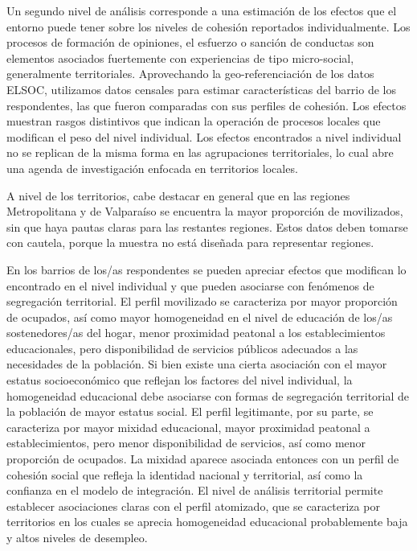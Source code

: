 \documentclass[
  12pt,
]{book}
\begin{document}
Un segundo nivel de análisis corresponde a una estimación de los efectos que el entorno puede tener sobre los niveles de cohesión reportados individualmente. Los procesos de formación de opiniones, el esfuerzo o sanción de conductas son elementos asociados fuertemente con experiencias de tipo micro-social, generalmente territoriales. Aprovechando la geo-referenciación de los datos ELSOC, utilizamos datos censales para estimar características del barrio de los respondentes, las que fueron comparadas con sus perfiles de cohesión. Los efectos muestran rasgos distintivos que indican la operación de procesos locales que modifican el peso del nivel individual. Los efectos encontrados a nivel individual no se replican de la misma forma en las agrupaciones territoriales, lo cual abre una agenda de investigación enfocada en territorios locales.

A nivel de los territorios, cabe destacar en general que en las regiones Metropolitana y de Valparaíso se encuentra la mayor proporción de movilizados, sin que haya pautas claras para las restantes regiones. Estos datos deben tomarse con cautela, porque la muestra no está diseñada para representar regiones.

En los barrios de los/as respondentes se pueden apreciar efectos que modifican lo encontrado en el nivel individual y que pueden asociarse con fenómenos de segregación territorial. El perfil movilizado se caracteriza por mayor proporción de ocupados, así como mayor homogeneidad en el nivel de educación de los/as sostenedores/as del hogar, menor proximidad peatonal a los establecimientos educacionales, pero disponibilidad de servicios públicos adecuados a las necesidades de la población. Si bien existe una cierta asociación con el mayor estatus socioeconómico que reflejan los factores del nivel individual, la homogeneidad educacional debe asociarse con formas de segregación territorial de la población de mayor estatus social. El perfil legitimante, por su parte, se caracteriza por mayor mixidad educacional, mayor proximidad peatonal a establecimientos, pero menor disponibilidad de servicios, así como menor proporción de ocupados. La mixidad aparece asociada entonces con un perfil de cohesión social que refleja la identidad nacional y territorial, así como la confianza en el modelo de integración. El nivel de análisis territorial permite establecer asociaciones claras con el perfil atomizado, que se caracteriza por territorios en los cuales se aprecia homogeneidad educacional probablemente baja y altos niveles de desempleo.
\end{document}
